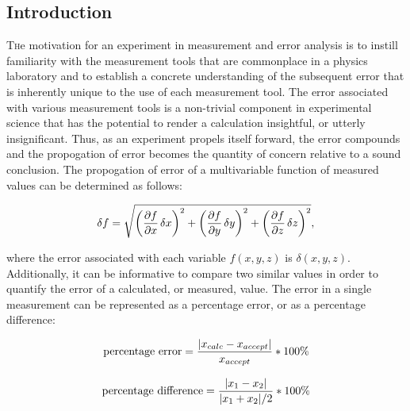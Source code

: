 \documentclass[twoside,10pt]{article}
\begin{document}
	\begin{multicols}{2} %
		
		\section{Introduction}
		
		\lettrine[nindent=0em,lines=2]{T} he motivation for an experiment in measurement and error analysis is to instill familiarity with the measurement tools that are commonplace in a physics laboratory and to establish a concrete understanding of the subsequent error that is inherently unique to the use of each measurement tool. The error associated with various measurement tools is a non-trivial component in experimental science that has the potential to render a calculation insightful, or utterly insignificant. Thus, as an experiment propels itself forward, the error compounds and the propogation of error becomes the quantity of concern relative to a sound conclusion. The propogation of error of a multivariable function of measured values can be determined as follows: 
		
		\begin{small}
		 \begin{equation}
		 	\delta f = \sqrt{\left( \pdv{f}{x} \hspace{.5mm}\delta x\right)^2 + \left( \pdv{f}{y} \hspace{.5mm} \delta y\right)^2 + \left( \pdv{f}{z} \hspace{.5mm} \delta z\right)^2} ,
		 \end{equation}
		\end{small}
	
		\noindent where the error associated with each variable $f(x,y,z)$ is $\delta(x,y,z)$. Additionally, it can be informative to compare two similar values in order to quantify the error of a  calculated, or measured, value. The error in a single measurement can be represented as a percentage error, or as a percentage difference: 
		
		\begin{small}
		\begin{equation}
		\textnormal{percentage error} = \frac{| x_{calc} - x_{accept}|}{x_{accept}} * 100 \% 
		\end{equation}
		\end{small}
	
		\begin{small}
		\begin{equation}
		\textnormal{percentage difference} = \frac{| x_{1} - x_{2}|}{|x_1 + x_2|/2} * 100 \% 
		\end{equation}
		\end{small}
		

\end{multicols}
\end{document}
